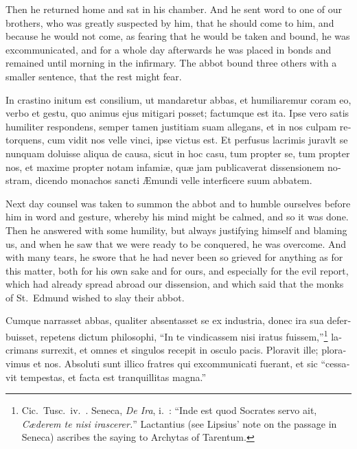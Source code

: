 \documentclass[10pt]{book}
\newcounter{engnote}
\newcommand{\engnotetext}[1]{\vphantom{\footnotemark{}}\footnotetext{#1}}
\begin{document}
\begin{paracol}{2}
\switchcolumn

Then he returned home and sat in his chamber. And he sent word to one of our brothers, who was greatly suspected by him, that he should come to him, and because he would not come, as fearing that he would be taken and bound, he was excommunicated, and for a whole day afterwards he was placed in bonds and remained until morning in the infirmary. The abbot bound three others with a smaller sentence, that the rest might fear.

\switchcolumn*

\begin{otherlanguage}{latin}
In crastino initum est consilium, ut mandaretur abbas, et humiliaremur coram eo, verbo et gestu, quo animus ejus mitigari posset; factumque est ita. Ipse vero satis humiliter respondens, semper tamen justitiam suam allegans, et in nos culpam retorquens, cum vidit nos velle vinci, ipse victus est. Et perfusus lacrimis juravlt se nunquam doluisse aliqua de causa, sicut in hoc casu, tum propter se, tum propter nos, et maxime propter notam infami\ae{}, qu\ae{} jam publicaverat dissensionem nostram, dicendo monachos sancti \AE{}mundi velle interficere suum abbatem.
\end{otherlanguage}

\switchcolumn

Next day counsel was taken to summon the abbot and to humble ourselves before him in word and gesture, whereby his mind might be calmed, and so it was done. Then he answered with some humility, but always justifying himself and blaming us, and when he saw that we were ready to be conquered, he was overcome. And with many tears, he swore that he had never been so grieved for anything as for this matter, both for his own sake and for ours, and especially for the evil report, which had already spread abroad our dissension, and which said that the monks of St.\ Edmund wished to slay their abbot.

\switchcolumn*

\begin{otherlanguage}{latin}
Cumque narrasset abbas, qualiter absentasset se ex industria, donec ira sua deferbuisset, repetens dictum philosophi, ``In te vindicassem nisi iratus fuissem,''\footnote[\textdagger]{Cic.\ Tusc.\ iv.\ . Seneca, \emph{De Ira}, i.\ : ``Inde est quod Socrates servo ait, \emph{C\ae{}derem te nisi irascerer.}'' Lactantius (see Lipsius' note on the passage in Seneca) ascribes the saying to Archytas of Tarentum.} lacrimans surrexit, et omnes et singulos recepit in osculo pacis. Ploravit ille; ploravimus et nos. Absoluti sunt illico fratres qui excommunicati fuerant, et sic ``cessavit tempestas, et facta est tranquillitas magna.''\engnotetext{Mark iv., \oldstylenums{39}.}
\end{otherlanguage}


\end{paracol}
\end{document}

